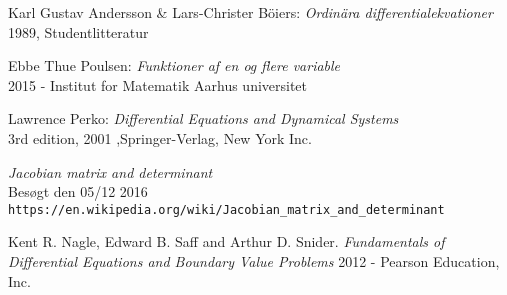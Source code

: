 \begin{thebibliography}{10}
Karl Gustav Andersson \& Lars-Christer Böiers:
\textit{Ordinära differentialekvationer}\\
1989, Studentlitteratur

Ebbe Thue Poulsen:
\textit{Funktioner af en og flere variable}\\
2015 - Institut for Matematik Aarhus universitet

Lawrence Perko:
\textit{Differential Equations and Dynamical Systems}\\
3rd edition, 2001 ,Springer-Verlag, New York Inc.

\textit{Jacobian matrix and determinant} \\
Besøgt den 05/12 2016 \\
\texttt{https://en.wikipedia.org/wiki/Jacobian\_matrix\_and\_determinant}

Kent R. Nagle, Edward B. Saff and Arthur D. Snider.
\textit{Fundamentals of Differential Equations and Boundary Value Problems}
2012 - Pearson Education, Inc.
\end{thebibliography}